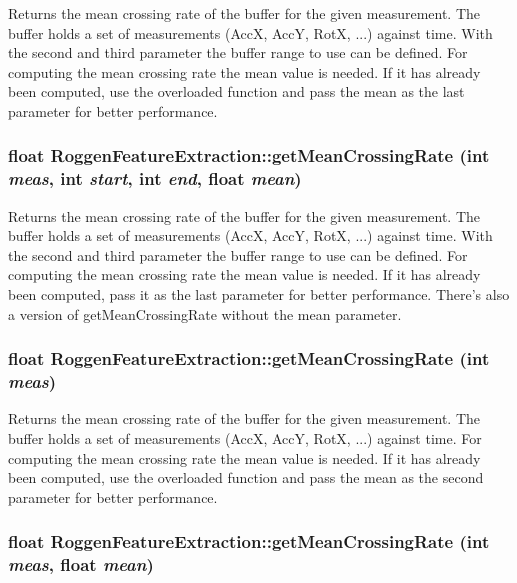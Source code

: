 Returns the mean crossing rate of the buffer for the given measurement. The buffer holds a set of measurements (AccX, AccY, RotX, ...) against time. With the second and third parameter the buffer range to use can be defined. For computing the mean crossing rate the mean value is needed. If it has already been computed, use the overloaded function and pass the mean as the last parameter for better performance. \hypertarget{classRoggenFeatureExtraction_abc1fe2fc6d6b562e1f5c92d0b36334e7}{
\subsubsection[{getMeanCrossingRate}]{\setlength{\rightskip}{0pt plus 5cm}float RoggenFeatureExtraction::getMeanCrossingRate (int {\em meas}, \/  int {\em start}, \/  int {\em end}, \/  float {\em mean})}}
\label{classRoggenFeatureExtraction_abc1fe2fc6d6b562e1f5c92d0b36334e7}
Returns the mean crossing rate of the buffer for the given measurement. The buffer holds a set of measurements (AccX, AccY, RotX, ...) against time. With the second and third parameter the buffer range to use can be defined. For computing the mean crossing rate the mean value is needed. If it has already been computed, pass it as the last parameter for better performance. There's also a version of getMeanCrossingRate without the mean parameter. \hypertarget{classRoggenFeatureExtraction_a19a17701ceaec1f656a6e3067bc364c7}{
\subsubsection[{getMeanCrossingRate}]{\setlength{\rightskip}{0pt plus 5cm}float RoggenFeatureExtraction::getMeanCrossingRate (int {\em meas})}}
\label{classRoggenFeatureExtraction_a19a17701ceaec1f656a6e3067bc364c7}
Returns the mean crossing rate of the buffer for the given measurement. The buffer holds a set of measurements (AccX, AccY, RotX, ...) against time. For computing the mean crossing rate the mean value is needed. If it has already been computed, use the overloaded function and pass the mean as the second parameter for better performance. \hypertarget{classRoggenFeatureExtraction_a731a33f8461bc0c4e0466ea628acf6ca}{
\subsubsection[{getMeanCrossingRate}]{\setlength{\rightskip}{0pt plus 5cm}float RoggenFeatureExtraction::getMeanCrossingRate (int {\em meas}, \/  float {\em mean})}}
